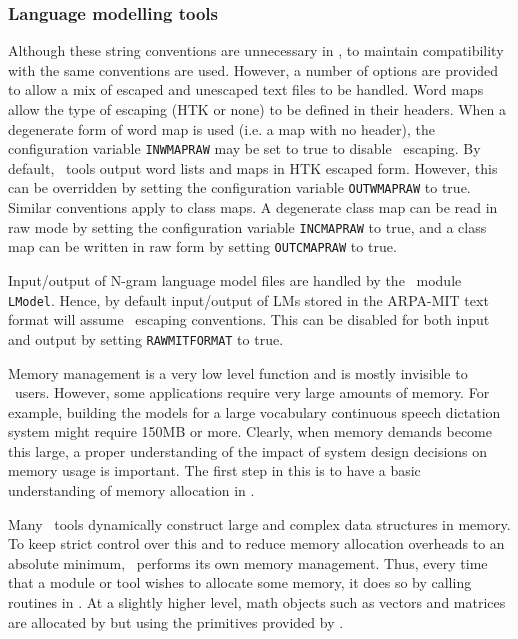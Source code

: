 \subsubsection{Language modelling tools}
Although these string conventions are unnecessary in \HLM, to maintain
compatibility with \HTK the same conventions are used. However, a
number of options are provided to allow a mix of escaped and unescaped
text files to be handled.  Word maps allow the type of escaping (HTK
or none) to be defined in their headers.  When a degenerate form of
word map is used (i.e. a map with no header), the 
configuration variable \texttt{INWMAPRAW} may be set to true to
disable \HTK\ escaping. By default, \HLM\ tools output word lists and
maps in HTK escaped form.  However, this can be overridden by setting
the configuration variable \texttt{OUTWMAPRAW} to true.  Similar
conventions apply to class maps.  A degenerate class map can be read
in raw mode by setting the  configuration variable
\texttt{INCMAPRAW} to true, and a class map can be written in raw form
by setting \texttt{OUTCMAPRAW} to  true.

Input/output of N-gram language model files are handled by the \HLM\
module \texttt{LModel}. Hence, by default input/output of LMs stored
in the ARPA-MIT text format will assume \HTK\ escaping conventions.
This can be disabled for both input and output by setting 
\texttt{RAWMITFORMAT} to true.



Memory management is a very low level function and is
mostly invisible to \HTK\ users.  However, some applications require very large
amounts of memory.  For example, building the models for a large vocabulary
continuous speech dictation system might require 150MB or more.  Clearly, when
memory demands become this large, a proper understanding of the impact of
system design decisions on memory usage is important.  The first step in this
is to have a basic understanding of memory allocation in \HTK.

Many \HTK\ tools dynamically construct large and complex data structures in
memory.  To keep strict control over this and to reduce memory allocation
overheads to an absolute minimum, \HTK\ performs its own memory
management. Thus, every time that a module or tool wishes to allocate some
memory, it does so by calling routines in
. At a slightly higher level, math objects
such as vectors and matrices are allocated by \htool{HMath} but using the
primitives provided by \htool{HMem}.


